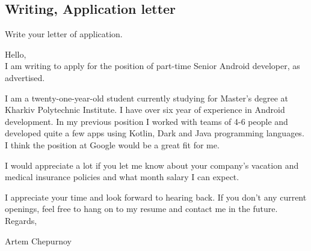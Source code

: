 \subsection*{Writing, Application letter}
Write your letter of application.

\begin{answer}
Hello,\\[4pt]

I am writing to apply for the position of part-time Senior Android developer, as advertised.

I am a twenty-one-year-old student currently studying for Master's degree at Kharkiv Polytechnic Institute. I have over six year of experience in Android development.
In my previous position I worked with teams of 4-6 people and developed quite a few apps using Kotlin, Dark and Java programming languages.
I think the position at Google would be a great fit for me.

I would appreciate a lot if you let me know about your company's vacation and medical insurance policies and what month salary I can expect.

I appreciate your time and look forward to hearing back.
If you don't any current openings, feel free to hang on to my resume and contact me in the future.\\[4pt]

Regards,

Artem Chepurnoy
\end{answer}

